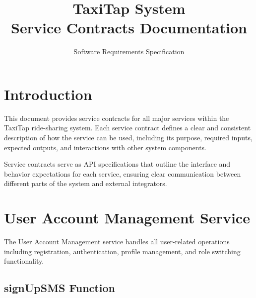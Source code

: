 \documentclass[11pt,a4paper]{article}
\title{TaxiTap System\\Service Contracts Documentation}
\author{Software Requirements Specification}
\date{}
\begin{document}
\maketitle
\newpage

\tableofcontents
\newpage

\section{Introduction}

This document provides service contracts for all major services within the TaxiTap ride-sharing system. Each service contract defines a clear and consistent description of how the service can be used, including its purpose, required inputs, expected outputs, and interactions with other system components.

Service contracts serve as API specifications that outline the interface and behavior expectations for each service, ensuring clear communication between different parts of the system and external integrators.

\section{User Account Management Service}

The User Account Management service handles all user-related operations including registration, authentication, profile management, and role switching functionality.

\subsection{signUpSMS Function}
\end{document}
